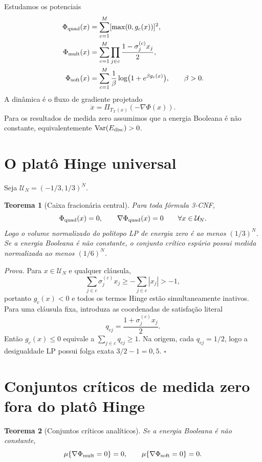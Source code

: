 \documentclass[11pt,a4paper]{article}
\newtheorem{theorem}{Teorema}[section]
\newcommand{\X}{\mathcal X}
\begin{document}
Estudamos os potenciais
\begin{align}
\Phi_{\rm quad}(x)&=\sum_{c=1}^M[\max(0,g_c(x))]^2,\\
\Phi_{\rm mult}(x)&=\sum_{c=1}^M\prod_{j\in c}\frac{1-\sigma_j^{(c)}x_j}{2},\\
\Phi_{\rm soft}(x)&=\sum_{c=1}^M\frac1\beta\log\bigl(1+e^{\beta g_c(x)}\bigr),\qquad \beta>0.
\end{align}
A dinâmica é o fluxo de gradiente projetado
\begin{equation}
\dot x=\Pi_{T_\X(x)}(-\nabla\Phi(x)).
\end{equation}
Para os resultados de medida zero assumimos que a energia Booleana é não constante, equivalentemente $\operatorname{Var}(E_{\rm disc})>0$.

\section{O platô Hinge universal}
Seja $\mathcal U_N=(-1/3,1/3)^N$.

\begin{theorem}[Caixa fracionária central]
Para toda fórmula 3-CNF,
\[
\Phi_{\rm quad}(x)=0,\qquad \nabla\Phi_{\rm quad}(x)=0\qquad \forall x\in\mathcal U_N.
\]
Logo o volume normalizado do politopo LP de energia zero é ao menos $(1/3)^N$. Se a energia Booleana é não constante, o conjunto crítico espúrio possui medida normalizada ao menos $(1/6)^N$.
\end{theorem}

\noindent\textit{Prova.} Para $x\in\mathcal U_N$ e qualquer cláusula,
\[
\sum_{j\in c}\sigma_j^{(c)}x_j\ge-\sum_{j\in c}|x_j|>-1,
\]
portanto $g_c(x)<0$ e todos os termos Hinge estão simultaneamente inativos. Para uma cláusula fixa, introduza as coordenadas de satisfação literal
\[
q_{cj}=\frac{1+\sigma_j^{(c)}x_j}{2}.
\]
Então $g_c(x)\le0$ equivale a $\sum_{j\in c}q_{cj}\ge1$. Na origem, cada $q_{cj}=1/2$, logo a desigualdade LP possui folga exata $3/2-1=0{,}5$. \hfill$\square$

\section{Conjuntos críticos de medida zero fora do platô Hinge}
\begin{theorem}[Conjuntos críticos analíticos]
Se a energia Booleana é não constante,
\[
\mu\{\nabla\Phi_{\rm mult}=0\}=0,\qquad \mu\{\nabla\Phi_{\rm soft}=0\}=0.
\]
\end{theorem}
\end{document}
